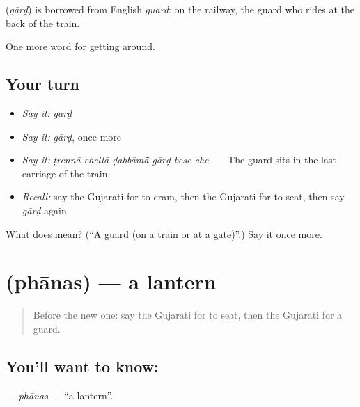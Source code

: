 \begin{cousinweb}
\textbf{} (\emph{gārḍ}) is borrowed from English \emph{guard}: on the railway, the guard who rides at the back of the train.
\end{cousinweb}

\begin{grammarlens}[title={What you've built}]
One more word for getting around.
\end{grammarlens}

\subsection*{Your turn}
\begin{itemize}
\raggedright
  \item \emph{Say it:} \emph{gārḍ}
  \item \emph{Say it:} \emph{gārḍ}, once more
  \item \emph{Say it:} \emph{ṭrennā chellā ḍabbāmā̃ gārḍ bese che.} — The guard sits in the last carriage of the train.
  \item \emph{Recall:} say the Gujarati for to cram, then the Gujarati for to seat, then say \emph{gārḍ} again
\end{itemize}

\begin{tcolorbox}[breakable,colback=teal!4,colframe=teal!35!black,title={Before you move on}]
What does  mean? (\textquotedblleft{}A guard (on a train or at a gate)\textquotedblright{}.) Say it once more.
\end{tcolorbox}
\section[\texorpdfstring{\gu{ફાનસ} (phānas)}{ફાનસ (phānas)}]{ (phānas) — a lantern}

\label{lesson:GU-C396-phanas}



\begin{quote}
Before the new one: say the Gujarati for to seat, then the Gujarati for a guard.
\end{quote}

\subsection*{You'll want to know: }
\textbf{} — \emph{phānas} — \textquotedblleft{}a lantern\textquotedblright{}.

